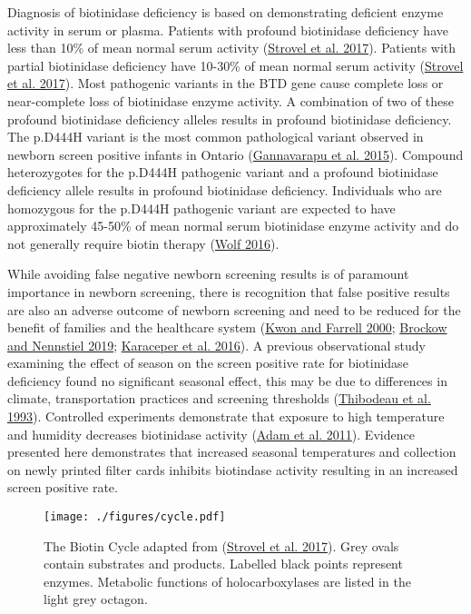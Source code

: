\documentclass[review]{elsarticle}
\begin{document}
Diagnosis of biotinidase deficiency is based on demonstrating
deficient enzyme activity in serum or plasma. Patients with profound
biotinidase deficiency have less than 10\% of mean normal serum
activity (\hyperlink{citeproc_bib_item_10}{Strovel et al. 2017}). Patients with partial biotinidase
deficiency have 10-30\% of mean normal serum activity (\hyperlink{citeproc_bib_item_10}{Strovel et al. 2017}). Most pathogenic variants in the BTD gene cause
complete loss or near-complete loss of biotinidase enzyme activity. A
combination of two of these profound biotinidase deficiency alleles
results in profound biotinidase deficiency. The p.D444H variant is the
most common pathological variant observed in newborn screen positive
infants in Ontario (\hyperlink{citeproc_bib_item_5}{Gannavarapu et al. 2015}). Compound heterozygotes for
the p.D444H pathogenic variant and a profound biotinidase deficiency
allele results in profound biotinidase deficiency. Individuals who are
homozygous for the p.D444H pathogenic variant are expected to have
approximately 45-50\% of mean normal serum biotinidase enzyme activity
and do not generally require biotin therapy (\hyperlink{citeproc_bib_item_16}{Wolf 2016}).

While avoiding false negative newborn screening results is of
paramount importance in newborn screening, there is recognition that
false positive results are also an adverse outcome of newborn
screening and need to be reduced for the benefit of families and the
healthcare system (\hyperlink{citeproc_bib_item_7}{Kwon and Farrell 2000}; \hyperlink{citeproc_bib_item_2}{Brockow and Nennstiel 2019}; \hyperlink{citeproc_bib_item_6}{Karaceper et al. 2016}). A
previous observational study examining the effect of season on the
screen positive rate for biotinidase deficiency found no significant
seasonal effect, this may be due to differences in climate,
transportation practices and screening thresholds (\hyperlink{citeproc_bib_item_12}{Thibodeau et al. 1993}). Controlled experiments demonstrate that
exposure to high temperature and humidity decreases biotinidase
activity (\hyperlink{citeproc_bib_item_1}{Adam et al. 2011}). Evidence presented here demonstrates that
increased seasonal temperatures and collection on newly printed filter
cards inhibits biotindase activity resulting in an increased screen
positive rate.



\begin{figure}[htbp]
\centering
\texttt{[image: ./figures/cycle.pdf]}
\caption{\label{fig:org082ab3c}The Biotin Cycle adapted from (\hyperlink{citeproc_bib_item_10}{Strovel et al. 2017}). Grey ovals contain substrates and products. Labelled black points represent enzymes. Metabolic functions of holocarboxylases are listed in the light grey octagon.}
\end{figure}
\end{document}
